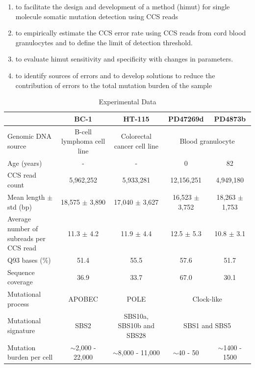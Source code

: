 \begin{enumerate}
\item to facilitate the design and development of a method (himut) for single molecule somatic mutation detection using CCS reads 
\item to empirically estimate the CCS error rate using CCS reads from cord blood granulocytes and to define the limit of detection threshold.
\item to evaluate himut sensitivity and specificity with changes in parameters.
\item to identify sources of errors and to develop solutions to reduce the contribution of errors to the total mutation burden of the sample
\end{enumerate}

\begin{table}[ht!]
\caption{Experimental Data}
\label{tab:CCS-sequence-statistics}
\begin{adjustbox}{max width=1.1\textwidth,center}
\begin{tabular}{l|c|c|cc}
                                     & BC-1 & HT-115 & PD47269d & PD4873b \\ \hline
Genomic DNA source                   & B-cell lymphoma cell line & Colorectal cancer cell line & \multicolumn{2}{c}{Blood granulocyte} \\  \hline
Age (years)                 		 & - & - & 0 & 82  \\ \hline
CCS read count                       &  5,962,252 &  5,933,281 & 12,156,251 & 4,949,180 \\ \hline
Mean length $\pm$ std (bp)  & 18,575 $\pm$ 3,890 & 17,040 $\pm$ 3,627   &  16,523 $\pm$ 3,752 & 18,263 $\pm$ 1,753 \\ \hline
\makecell[{l}]{Average number of \\ subreads per CCS read}  & 11.3 $\pm$ 4.2 & 11.9 $\pm$ 4.4  & 12.5 $\pm$ 5.3  & 10.8 $\pm$ 3.1 \\ \hline
Q93 bases (\%) 						 & 51.4 & 55.5 & 57.6 & 51.7 \\ \hline
Sequence coverage 				     & 36.9 & 33.7 & 67.0 & 30.1 \\ \hline
Mutational process   			     & APOBEC & POLE & \multicolumn{2}{c}{Clock-like} \\ \hline
Mutational signature 				 & SBS2   & SBS10a, SBS10b and SBS28 & \multicolumn{2}{c}{SBS1 and SBS5} \\ \hline
Mutation burden per cell 		     & $\sim$2,000 - 22,000 & $\sim$8,000 - 11,000 & $\sim$40 - 50 & $\sim$1400 - 1500 \\ \hline 
\end{tabular}
\end{adjustbox} 
\end{table}

